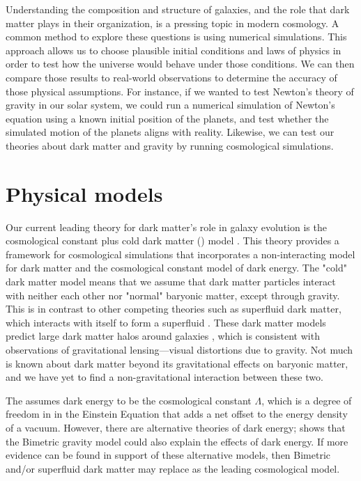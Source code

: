 
Understanding the composition and structure of galaxies, and the role that dark matter plays in their organization, is a pressing topic in modern cosmology. A common method to explore these questions is using numerical simulations. This approach allows us to choose plausible initial conditions and laws of physics in order to test how the universe would behave under those conditions. We can then compare those results to real-world observations to determine the accuracy of those physical assumptions. For instance, if we wanted to test Newton's theory of gravity in our solar system, we could run a numerical simulation of Newton's equation using a known initial position of the planets, and test whether the simulated motion of the planets aligns with reality. Likewise, we can test our theories about dark matter and gravity by running cosmological simulations.

\section{Physical models}

Our current leading theory for dark matter's role in galaxy evolution is the cosmological constant plus cold dark matter (\lcdm) model \citep{salesBaryonicSolutionsChallenges2022}. This theory provides a framework for cosmological simulations that incorporates a non-interacting model for dark matter and the cosmological constant model of dark energy. The "cold" dark matter model means that we assume that dark matter particles interact with neither each other nor "normal" baryonic matter, except through gravity. This is in contrast to other competing theories such as superfluid dark matter, which interacts with itself to form a superfluid \citep{delucaSuperfluidDarkMatter2023}. These dark matter models predict large dark matter halos around galaxies \citep{feldmannFIREboxSimulatingGalaxies2022}, which is consistent with observations of gravitational lensing---visual distortions due to gravity. Not much is known about dark matter beyond its gravitational effects on baryonic matter, and we have yet to find a non-gravitational interaction between these two.

The \lcdm\space assumes dark energy to be the cosmological constant $\Lambda$, which is a degree of freedom in in the Einstein Equation that adds a net offset to the energy density of a vacuum. However, there are alternative theories of dark energy; \cite{bassiCosmologicalEvolutionBimetric2023} shows that the Bimetric gravity model could also explain the effects of dark energy. If more evidence can be found in support of these alternative models, then Bimetric and/or superfluid dark matter may replace \lcdm\space as the leading cosmological model.

